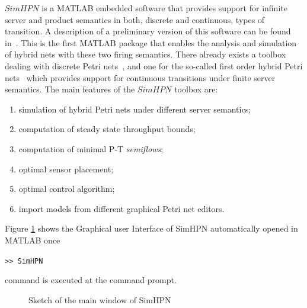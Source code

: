 $SimHPN$ is a MATLAB embedded software that provides support for infinite server and product semantics in both, discrete and continuous, types of transition. A description of a preliminary version of this software can be found in~\cite{JuMa10,JuMaVa11,simhpn2012806}. This is the first MATLAB package that enables the analysis and simulation of hybrid nets with these two firing semantics. There already exists a toolbox dealing with discrete Petri nets~\cite{IPMaMaPa03c}, and one for the so-called first order hybrid Petri nets~\cite{ICSeGiSe08} which provides support for continuous transitions under finite server semantics. The main features of the $SimHPN$ toolbox are: 
\begin{enumerate}
\item simulation of hybrid Petri nets under different server semantics; 
\item computation of steady state throughput bounds; 
\item computation of minimal P-T \emph{semiflows}; 
\item optimal sensor placement;
\item  optimal control algorithm; 
\item import models from different graphical Petri net editors.
\end{enumerate}

Figure \ref{f-main} shows the Graphical user Interface of SimHPN automatically opened in MATLAB once 

\texttt{>> SimHPN} 

command is executed at the command prompt. 

\begin{figure}
   \caption{Sketch of the main window of SimHPN}
   \label{f-main}
\end{figure}


\newpage
